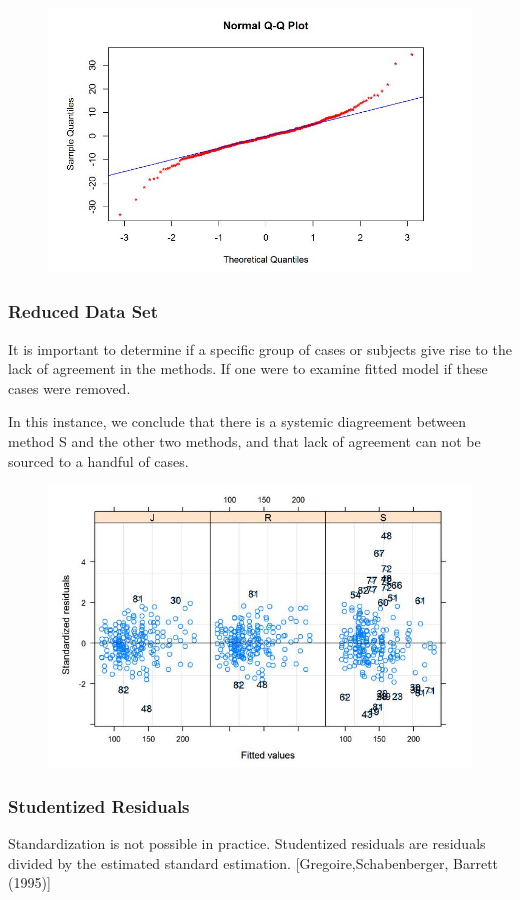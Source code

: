 \documentclass[12pt, a4paper]{report}
\theoremstyle{plain}
\theoremstyle{definition}
\theoremstyle{remark}
\begin{document}
\begin{figure}[h!]
	\centering
	\includegraphics[width=0.7\linewidth]{images/Resid-newplot}
	\caption{}
	\label{fig:Resid-newplot}
\end{figure}




\subsubsection{Reduced Data Set}
It is important to determine if a specific group of cases or subjects give rise to the lack of agreement in the methods. If one were to examine fitted model if these cases were removed.

In this instance, we conclude that there is a systemic diagreement between method S and the other two methods, and that lack of agreement can not be sourced to a handful of cases.
\begin{figure}[h!]
	\centering
	\includegraphics[width=0.7\linewidth]{images/bloodnlmeResidPlot2B}
\end{figure}


\subsubsection{Studentized Residuals}
Standardization is not possible in practice. Studentized residuals are residuals divided by the estimated standard estimation.
[Gregoire,Schabenberger, Barrett (1995)]
\end{document}

